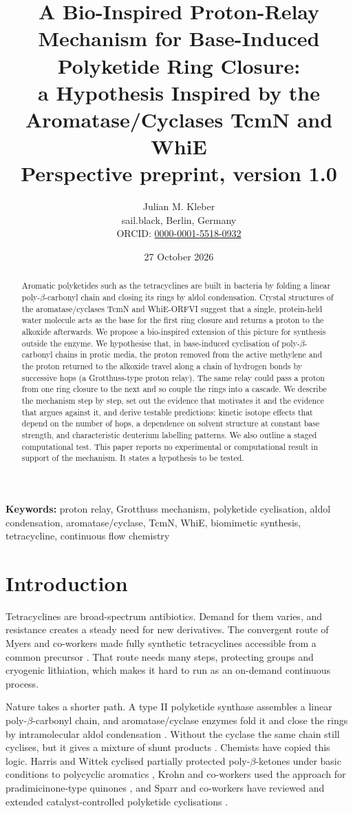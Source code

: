\documentclass[11pt]{article}
\title{A Bio-Inspired Proton-Relay Mechanism for Base-Induced Polyketide Ring Closure:\\ a Hypothesis Inspired by the Aromatase/Cyclases TcmN and WhiE\\[6pt]\large Perspective preprint, version 1.0}
\author{Julian M. Kleber\\[2pt]\small sail.black, Berlin, Germany\\\small ORCID: \href{https://orcid.org/0000-0001-5518-0932}{0000-0001-5518-0932}}
\date{27 October 2026}
\begin{document}
\maketitle

\begin{abstract}
Aromatic polyketides such as the tetracyclines are built in bacteria by folding a linear poly-$\beta$-carbonyl chain and closing its rings by aldol condensation. Crystal structures of the aromatase/cyclases TcmN and WhiE-ORFVI suggest that a single, protein-held water molecule acts as the base for the first ring closure and returns a proton to the alkoxide afterwards. We propose a bio-inspired extension of this picture for synthesis outside the enzyme. We hypothesise that, in base-induced cyclisation of poly-$\beta$-carbonyl chains in protic media, the proton removed from the active methylene and the proton returned to the alkoxide travel along a chain of hydrogen bonds by successive hops (a Grotthuss-type proton relay). The same relay could pass a proton from one ring closure to the next and so couple the rings into a cascade. We describe the mechanism step by step, set out the evidence that motivates it and the evidence that argues against it, and derive testable predictions: kinetic isotope effects that depend on the number of hops, a dependence on solvent structure at constant base strength, and characteristic deuterium labelling patterns. We also outline a staged computational test. This paper reports no experimental or computational result in support of the mechanism. It states a hypothesis to be tested.
\end{abstract}
\noindent\textbf{Keywords:} proton relay, Grotthuss mechanism, polyketide cyclisation, aldol condensation, aromatase/cyclase, TcmN, WhiE, biomimetic synthesis, tetracycline, continuous flow chemistry

\section{Introduction}
Tetracyclines are broad-spectrum antibiotics. Demand for them varies, and resistance creates a steady need for new derivatives. The convergent route of Myers and co-workers made fully synthetic tetracyclines accessible from a common precursor \cite{charest2005sci,charest2005jacs}. That route needs many steps, protecting groups and cryogenic lithiation, which makes it hard to run as an on-demand continuous process.

Nature takes a shorter path. A type II polyketide synthase assembles a linear poly-$\beta$-carbonyl chain, and aromatase/cyclase enzymes fold it and close the rings by intramolecular aldol condensation \cite{zhou2010}. Without the cyclase the same chain still cyclises, but it gives a mixture of shunt products \cite{shen1996}. Chemists have copied this logic. Harris and Wittek cyclised partially protected poly-$\beta$-ketones under basic conditions to polycyclic aromatics \cite{harris1975}, Krohn and co-workers used the approach for pradimicinone-type quinones \cite{krohn2000}, and Sparr and co-workers have reviewed and extended catalyst-controlled polyketide cyclisations \cite{faseke2020}.
\end{document}
